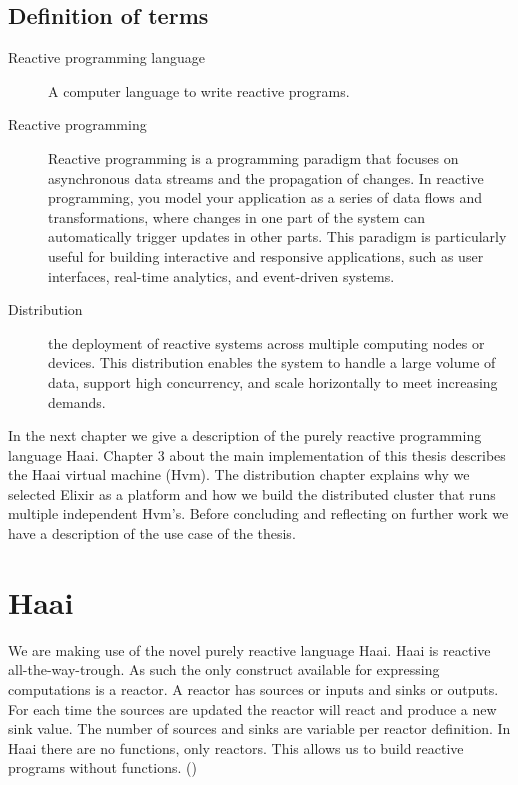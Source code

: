 \documentclass[a4paper]{book}
\begin{document}
\section{Definition of terms}
\begin{description}
	\item[Reactive programming language] A computer language to write reactive programs.
	\item[Reactive programming] Reactive programming is a programming paradigm that focuses on asynchronous data streams and the propagation of changes. In reactive programming, you model your application as a series of data flows and transformations, where changes in one part of the system can automatically trigger updates in other parts. This paradigm is particularly useful for building interactive and responsive applications, such as user interfaces, real-time analytics, and event-driven systems.
	\item[Distribution] the deployment of reactive systems across multiple computing nodes or devices. This distribution enables the system to handle a large volume of data, support high concurrency, and scale horizontally to meet increasing demands.
\end{description}


In the next chapter we give a description of the purely reactive programming language Haai. Chapter 3 about the main implementation of this thesis describes the Haai virtual machine (Hvm). The distribution chapter explains why we selected Elixir as a platform and how we build the distributed cluster that runs multiple independent Hvm's. Before concluding and reflecting on further work we have a description of the use case of the thesis. 


\chapter{Haai}
We are making use of the novel purely reactive language Haai. Haai is reactive all-the-way-trough. As such the only construct available for expressing computations is a reactor. A reactor has sources or inputs and sinks or outputs. For each time the sources are updated the reactor will react and produce a new sink value. The number of sources and sinks are variable per reactor definition. In Haai there are no functions, only reactors. This allows us to build reactive programs without functions. (\cite{oeyen_reactive_2024})
\end{document}
